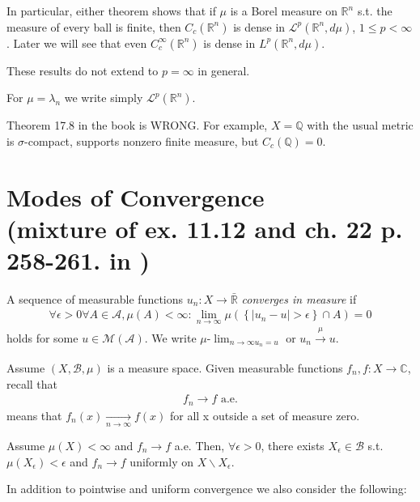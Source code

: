 In particular, either theorem shows that if \(\mu\) is a Borel measure on \(\mathbb{R}^n\) s.t. the measure of every ball is finite, then 
\(C_c(\mathbb{R}^n)\) is dense in \(\mathcal{L}^p(\mathbb{R}^n, d\mu)\), \(1\leq p< \infty\). Later we will see that even 
\(C^{\infty}_{c}(\mathbb{R}^n)\) is dense in \(L^p(\mathbb{R}^n, d\mu)\).
\begin{remark}
    These results do not extend to \(p=\infty\) in general. 

    For \(\mu=\lambda_n\) we write simply \(\mathcal{L}^p(\mathbb{R}^n)\).
\end{remark}
\begin{remark}
    Theorem 17.8 in the book is WRONG. For example, \(X=\mathbb{Q}\) with the usual metric is \(\sigma\)-compact, supports nonzero finite measure,
    but \(C_c(\mathbb{Q})=0\).
\end{remark}

\section*{Modes of Convergence \protect\\ \tiny{(mixture of ex. 11.12 and ch. 22 p. 258-261. in \cite{schilling2017measures})}}
\ifdetailed
\begin{definition}
    A sequence of measurable functions \(u_n:X\rightarrow \bar{\mathbb{R}}\) \emph{converges in measure} if
    \begin{align*}
        \forall\epsilon>0\forall A\in\mathscr{A},\mu(A)<\infty:\lim\limits_{n\rightarrow\infty} 
        \mu\left(\left\{\vert u_n - u\vert > \epsilon\right\}\cap A\right) = 0
    \end{align*}
    holds for some \(u\in\mathcal{M}(\mathscr{A})\). We write \(\mu\)-\(\lim_{n\rightarrow\infty u_n = u}\) or 
    \(u_n\xrightarrow[ ]{\mu} u\).
\end{definition}
\fi
Assume \(\left(X,\mathscr{B},\mu\right)\) is a measure space. Given measurable functions \(f_n,f:X\rightarrow\mathbb{C}\), recall that
\begin{align*}
    f_n\rightarrow f \text{ a.e.}
\end{align*}
means that \(f_n(x)\xrightarrow[n\rightarrow\infty]{ } f(x)\) for all x outside a set of measure zero. 
\begin{theorem}
    Assume \(\mu(X)<\infty\) and \(f_n\rightarrow f\) a.e. Then, \(\forall\epsilon>0\), there exists \(X_{\epsilon} \in\mathscr{B}\)
    s.t. \(\mu(X_{\epsilon})<\epsilon\) and \(f_n\rightarrow f\) uniformly on \(X\backslash X_{\epsilon}\).
\end{theorem}
In addition to pointwise and uniform convergence we also consider the following: 

